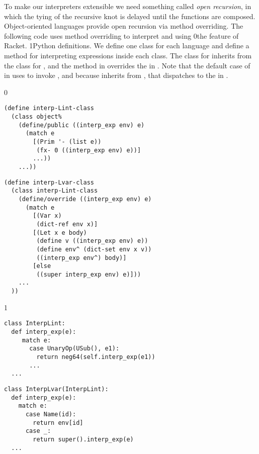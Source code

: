 \documentclass[7x10]{TimesAPriori_MIT}%
\def\racketEd{0}
\def\pythonEd{1}
\def\edition{1}
\newcommand{\racket}[1]{{\if\edition\racketEd{#1}\fi}}
\newcommand{\pythonColor}[0]{}
\newcommand{\python}[1]{{\if\edition\pythonEd\pythonColor #1\fi}}
\numberwithin{theorem}{chapter}
\numberwithin{definition}{chapter}
\numberwithin{equation}{chapter}
\begin{document}
To make our interpreters extensible we need something called
\emph{open recursion}, in which the
tying of the recursive knot is delayed until the functions are
composed. Object-oriented languages provide open recursion via method
overriding. The following code uses
method overriding to interpret \LangInt{} and \LangVar{} using
%
\racket{the
  \href{https://docs.racket-lang.org/guide/classes.html}{\code{class}}
  \index{subject}{class} feature of Racket.}%
%
\python{Python  definitions.}
%
We define one class for each language and define a method for
interpreting expressions inside each class. The class for \LangVar{}
inherits from the class for \LangInt{}, and the method
 in \LangVar{} overrides the  in
\LangInt{}. Note that the default case of  in
\LangVar{} uses  to invoke , and because
\LangVar{} inherits from \LangInt{}, that dispatches to the
 in \LangInt{}.
\begin{center}
  \hspace{-20pt}
{\if\edition\racketEd  
\begin{minipage}{0.45\textwidth}
\begin{lstlisting}
(define interp-Lint-class
  (class object%
    (define/public ((interp_exp env) e)
      (match e
        [(Prim '- (list e))
         (fx- 0 ((interp_exp env) e))]
        ...))
    ...))
\end{lstlisting}
\end{minipage}
\begin{minipage}{0.45\textwidth}
  \begin{lstlisting}
(define interp-Lvar-class
  (class interp-Lint-class
    (define/override ((interp_exp env) e)
      (match e
        [(Var x)
         (dict-ref env x)]
        [(Let x e body)
         (define v ((interp_exp env) e))
         (define env^ (dict-set env x v))
         ((interp_exp env^) body)]
        [else
         ((super interp_exp env) e)]))
    ...
  ))
\end{lstlisting}
\end{minipage}
\fi}
{\if\edition\pythonEd\pythonColor
\begin{minipage}{0.45\textwidth}
\begin{lstlisting}
class InterpLint:
  def interp_exp(e):
     match e:
       case UnaryOp(USub(), e1):
         return neg64(self.interp_exp(e1))
       ...
  ...
\end{lstlisting}
\end{minipage}
\begin{minipage}{0.45\textwidth}
  \begin{lstlisting}
class InterpLvar(InterpLint):
  def interp_exp(e):
    match e:
      case Name(id):
        return env[id]
      case _:
        return super().interp_exp(e)
  ...
\end{lstlisting}
\end{minipage}
\fi}
\end{center}
\end{document}

